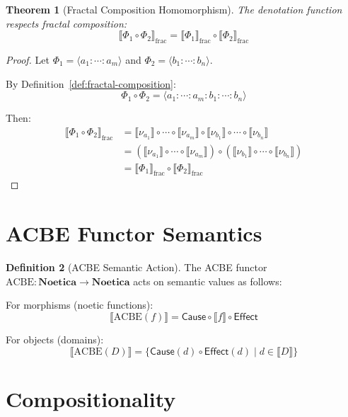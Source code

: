 \documentclass[11pt,twoside,openright]{book}
\theoremstyle{definition}
\newtheorem{definition}{Definition}[chapter]
\theoremstyle{plain}
\newtheorem{theorem}[definition]{Theorem}
\theoremstyle{remark}
\newcommand{\noe}[1]{\nu_{#1}}
\newcommand{\Frac}{\Phi}
\begin{document}
\begin{theorem}[Fractal Composition Homomorphism]
\label{thm:fractal-homomorphism}
The denotation function respects fractal composition:
\[
\llbracket \Frac_1 \circ \Frac_2 \rrbracket_{\text{frac}} = \llbracket \Frac_1 \rrbracket_{\text{frac}} \circ \llbracket \Frac_2 \rrbracket_{\text{frac}}
\]
\end{theorem}

\begin{proof}
Let $\Frac_1 = \langle a_1 : \cdots : a_m \rangle$ and $\Frac_2 = \langle b_1 : \cdots : b_n \rangle$.

By Definition~\ref{def:fractal-composition}:
\[
\Frac_1 \circ \Frac_2 = \langle a_1 : \cdots : a_m : b_1 : \cdots : b_n \rangle
\]

Then:
\begin{align}
\llbracket \Frac_1 \circ \Frac_2 \rrbracket_{\text{frac}}
&= \llbracket \noe{a_1} \rrbracket \circ \cdots \circ \llbracket \noe{a_m} \rrbracket \circ \llbracket \noe{b_1} \rrbracket \circ \cdots \circ \llbracket \noe{b_n} \rrbracket \\
&= (\llbracket \noe{a_1} \rrbracket \circ \cdots \circ \llbracket \noe{a_m} \rrbracket) \circ (\llbracket \noe{b_1} \rrbracket \circ \cdots \circ \llbracket \noe{b_n} \rrbracket) \\
&= \llbracket \Frac_1 \rrbracket_{\text{frac}} \circ \llbracket \Frac_2 \rrbracket_{\text{frac}}
\end{align}
\end{proof}

\section{ACBE Functor Semantics}

\begin{definition}[ACBE Semantic Action]
\label{def:acbe-semantics}
The ACBE functor $\text{ACBE} : \mathbf{Noetica} \to \mathbf{Noetica}$ acts on semantic values as follows:

For morphisms (noetic functions):
\[
\llbracket \text{ACBE}(f) \rrbracket = \mathsf{Cause} \circ \llbracket f \rrbracket \circ \mathsf{Effect}
\]

For objects (domains):
\[
\llbracket \text{ACBE}(D) \rrbracket = \{ \mathsf{Cause}(d) \circ \mathsf{Effect}(d) \mid d \in \llbracket D \rrbracket \}
\]
\end{definition}

\section{Compositionality}
\end{document}
